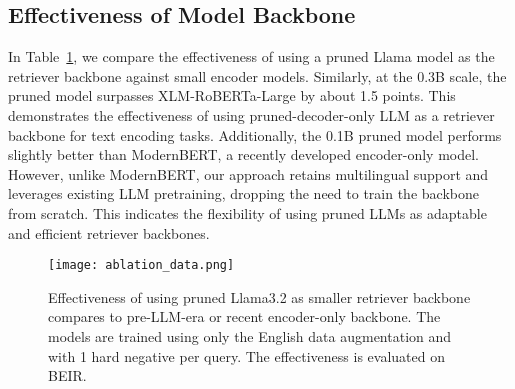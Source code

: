\documentclass[]{fairmeta}
\begin{document}
\subsection{Effectiveness of Model Backbone}

In Table~\ref{tab:backbone}, we compare the effectiveness of using a pruned Llama model as the retriever backbone against small encoder models.
Similarly, at the 0.3B scale, the pruned model surpasses XLM-RoBERTa-Large by about 1.5 points.
This demonstrates the effectiveness of using pruned-decoder-only LLM as a retriever backbone for text encoding tasks.
Additionally, the 0.1B pruned model performs slightly better than ModernBERT, a recently developed encoder-only model.
However, unlike ModernBERT, our approach retains multilingual support and leverages existing LLM pretraining, dropping the need to train the backbone from scratch.
This indicates the flexibility of using pruned LLMs as adaptable and efficient retriever backbones.

\begin{figure}[t]
    \centering
    \begin{minipage}{0.49\textwidth}
        \centering
        \texttt{[image: ablation\_data.png]}
        \caption{Effectiveness of different data augmentation combinations (\textbf{FT}: SFT data, \textbf{Sent}: augmentation data based on cropped sentence query, \textbf{QGen}: augmentation data based on LLM generated query, \textbf{Rerank}: augmentation data based on LLM rerank. \textbf{Triplet}: augmentation data based on LLM triplet generation.). The model is trained based on 0.1B backbone, using only the English data augmentation and with 1 hard negative per query.}
    \label{fig:ablation-data}
    \end{minipage}
    \hfill
    \begin{minipage}{0.49\textwidth}
        \centering
    \vspace{0.4cm}
    \caption{Effectiveness of using pruned Llama3.2 as smaller retriever backbone compares to pre-LLM-era or recent encoder-only backbone. The models are trained using only the English data augmentation and with 1 hard negative per query. The effectiveness is evaluated on BEIR.}
    \label{tab:backbone}
    \end{minipage}
\end{figure}
\end{document}
